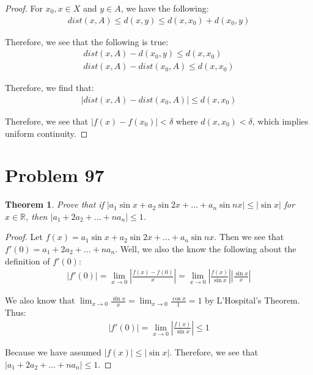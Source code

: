 \documentclass[psamsfonts]{amsart}
\newtheorem{thm}{Theorem}[section]
\theoremstyle{definition}
\theoremstyle{remark}
\numberwithin{equation}{section}
\begin{document}
\begin{proof}
For $x_0,x \in X$ and $y \in A$, we have the following:
\begin{eqnarray}
dist(x,A) \leq d(x,y) \leq d(x,x_0) + d( x_0,y) 
\end{eqnarray}

Therefore, we see that the following is true:
\begin{eqnarray}
dist(x,A) - d(x_0,y) \leq d(x,x_0) \\
dist(x,A) - dist(x_0,A) \leq d(x,x_0)
\end{eqnarray}

Therefore, we find that:
\begin{eqnarray}
|dist(x,A) - dist(x_0,A)| \leq d(x,x_0)
\end{eqnarray}

Therefore, we see that $|f(x) - f(x_0)| < \delta$ where $d(x,x_0) < \delta$, which implies uniform continuity.
\end{proof}

\section{Problem 97}

\begin{thm}
Prove that if $|a_1 \sin x + a_2 \sin 2x + \ldots + a_n \sin n x | \leq |\sin x|$ for $x \in \mathbb{R}$, then $|a_1 + 2 a_2 + \ldots + n a_n| \leq 1$. 
\end{thm}

\begin{proof}
Let $f(x) = a_1 \sin x + a_2 \sin 2x + \ldots + a_n \sin n x$. Then we see that $f'(0) = a_1 + 2 a_2 + \ldots + n a_n$. Well, we also the know the following about the definition of $f'(0)$:
\begin{eqnarray}
|f'(0)| = \lim_{x \to 0} \left| \frac{f(x) - f(0)}{x} \right| = \lim_{x \to 0} \left| \frac{f(x)}{\sin x} \right| \left| \frac{\sin x}{x} \right|
\end{eqnarray}

We also know that $\lim_{x \to 0} \frac{\sin x}{x} = \lim_{x \to 0} \frac{\cos x}{1} = 1$ by L'Hospital's Theorem. Thus:
\begin{eqnarray}
|f'(0)| = \lim_{x \to 0} \left| \frac{f(x)}{\sin x} \right| \leq 1
\end{eqnarray}

Because we have assumed $|f(x)| \leq |\sin x|$. Therefore, we see that $|a_1 + 2 a_2 + \ldots + n a_n | \leq 1$. 
\end{proof}
\end{document}
